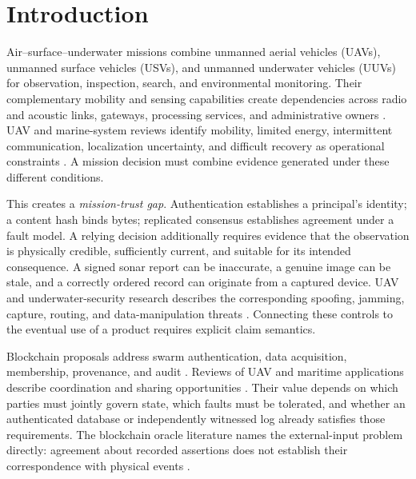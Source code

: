 \section{Introduction}

Air--surface--underwater missions combine unmanned aerial vehicles (UAVs), unmanned surface vehicles (USVs), and unmanned underwater vehicles (UUVs) for observation, inspection, search, and environmental monitoring. Their complementary mobility and sensing capabilities create dependencies across radio and acoustic links, gateways, processing services, and administrative owners \citep{li2023survey,wei20233u,pang2026cooperative}. UAV and marine-system reviews identify mobility, limited energy, intermittent communication, localization uncertainty, and difficult recovery as operational constraints \citep{hayat2016survey,shakhatreh2019unmanned,bae2023survey,gonzlezgarca2020autonomous}. A mission decision must combine evidence generated under these different conditions.

This creates a \emph{mission-trust gap}. Authentication establishes a principal's identity; a content hash binds bytes; replicated consensus establishes agreement under a fault model. A relying decision additionally requires evidence that the observation is physically credible, sufficiently current, and suitable for its intended consequence. A signed sonar report can be inaccurate, a genuine image can be stale, and a correctly ordered record can originate from a captured device. UAV and underwater-security research describes the corresponding spoofing, jamming, capture, routing, and data-manipulation threats \citep{mekdad2023survey,wang2025survey,hadi2023comprehensive,jiang2019securing,yisa2021security}. Connecting these controls to the eventual use of a product requires explicit claim semantics.

Blockchain proposals address swarm authentication, data acquisition, membership, provenance, and audit \citep{han2022identity,tan2022blockchain,karmakar2024blockchain,islam2019bus}. Reviews of UAV and maritime applications describe coordination and sharing opportunities \citep{hafeez2023blockchain,alladi2020applications,mehta2020blockchain,farah2024survey,li2021survey}. Their value depends on which parties must jointly govern state, which faults must be tolerated, and whether an authenticated database or independently witnessed log already satisfies those requirements. The blockchain oracle literature names the external-input problem directly: agreement about recorded assertions does not establish their correspondence with physical events \citep{caldarelli2020oracle,albreiki2020oracles}.

